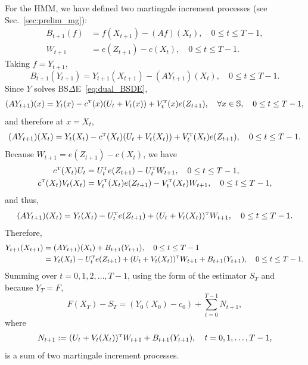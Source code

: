 \documentclass[twoside,11pt]{article}
\def\Sec#1{Sec.~\ref{#1}}
\def\Sec#1{Sec.~\ref{#1}}
\def\Sec#1{Sec~\ref{#1}}
\def\Sec#1{Sec.~\ref{#1}}
\def\bS{\begin{slide}}
\def\Sec#1{Sec.~\ref{#1}}
\def\bS{\mathbb{S}}
\def\tp{{\hbox{\rm\tiny T}}}
\begin{document}
For the HMM, we have defined two martingale increment processes (see \Sec{sec:prelim_mg}):
\begin{align*}
  B_{t+1}(f) &= f(X_{t+1}) - (Af)(X_t),\quad 0\leq t\leq T-1,\\
  W_{t+1} &= e(Z_{t+1})- c(X_t) ,\quad 0\leq t\leq T-1.
\end{align*}
Taking $f=Y_{t+1}$,
\begin{equation*}
 B_{t+1}(Y_{t+1}) = Y_{t+1}(X_{t+1}) - (A Y_{t+1})(X_t) ,\quad 0\leq t\leq T-1.
\end{equation*}
Since $Y$ solves BS$\Delta$E~\eqref{eq:dual_BSDE},
\begin{equation*}
(AY_{t+1})(x) = Y_{t}(x) - c^\tp(x) (U_t + V_t(x)) + V_t^\tp(x) e(Z_{t+1}),\quad
\forall x\in \bS ,\quad 0\leq t\leq T-1,
\end{equation*}
and therefore at $x=X_t$,
\begin{equation*}
(AY_{t+1})(X_t) = Y_{t}(X_t) -  c^\tp(X_t) (U_t + V_t(X_t)) + V_t^\tp(X_t) e(Z_{t+1}) ,\quad 0\leq t\leq T-1.
\end{equation*}
Because $W_{t+1} = e(Z_{t+1}) - c(X_t)$, we have
\begin{align*}
  c^\tp(X_t) U_t &= U_t^\tp e(Z_{t+1}) - U_t^\tp W_{t+1},\quad 0\leq t\leq T-1, \\
  c^\tp(X_t) V_t(X_t) &= V_t^\tp(X_t) e(Z_{t+1}) - V_t^\tp(X_t) W_{t+1} ,\quad 0\leq t\leq T-1,
\end{align*}
and thus,
\begin{equation*}
(AY_{t+1})(X_t) = Y_{t}(X_t) - U_t^\tp e(Z_{t+1}) + (U_t + V_t(X_t))^\tp W_{t+1},\quad 0\leq t\leq T-1.
\end{equation*}
Therefore,
\begin{align*}
  Y_{t+1}(X_{t+1}) & = (A Y_{t+1})(X_t) + B_{t+1}(Y_{t+1}) ,\quad 0\leq t\leq T-1 \\
  &= Y_{t}(X_t) - U_t^\tp e(Z_{t+1}) + (U_t + V_t(X_t))^\tp W_{t+1} + B_{t+1}(Y_{t+1}) ,\quad 0\leq t\leq T-1.
\end{align*}
Summing over $t=0,1,2,\hdots,T-1$, using the form
of the estimator $S_T$ and because $Y_T=F$,
\begin{equation*}
F(X_T) - S_T = (Y_0(X_0) -c_0) +\sum_{t=0}^{T-1} N_{t+1},
\end{equation*}
where
\begin{equation*}
N_{t+1} := (U_t + V_t(X_t))^\tp W_{t+1} + B_{t+1}(Y_{t+1}),\quad t=0,1,\hdots,T-1,
\end{equation*}
is a sum of two martingale increment processes.
\end{document}
